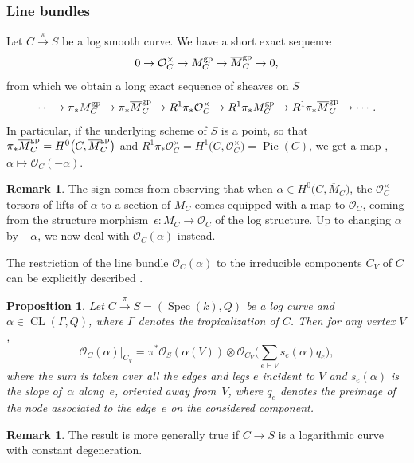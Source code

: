 \documentclass[pdftex]{sigma}
\newcommand{\Pic}{\operatorname{Pic}}
\renewcommand{\O}{\mathcal{O}}
\numberwithin{equation}{section}
\newtheorem{prop}[theo]{Proposition}
\theoremstyle{definition}
\newtheorem{remarkk}[theo]{Remark}
\begin{document}
\subsubsection{Line bundles}
Let $C\xrightarrow{\pi} S$ be a log smooth curve. We have a short exact sequence
\begin{equation}\label{eq:logseq}
0\to\mathcal O_C^{\times}\to M_C^{\rm gp}\to\overline{M}_C^{\rm gp}\to 0,\end{equation}
from which we obtain a long exact sequence of sheaves on $S$
\begin{align*}
 \cdots\to \pi_*M_C^{\rm gp}\to\pi_*\overline{M}_C^{\rm gp}\to
 R^1\pi_*\mathcal O_C^{\times}\to
 R^1\pi_*M_C^{\rm gp}\to R^1\pi_*\overline{M}_C^{\rm gp}\to\cdots.
\end{align*}
In particular, if the underlying scheme of $S$ is a point, so that $\pi_*\overline{M}^{\rm gp}_C=H^0\bigl(C,\overline{M}^{\rm gp}_C\bigr)$ and $R^1\pi_*\O_C^\times=H^1\bigl(C,\O_C^\times\bigr)=\Pic(C)$, we get a map
\smash{$
 H^0\bigl(C,\overline{M}_C^{\rm gp}\bigr)\to \Pic^0(C)$}, $
 \alpha \mapsto\mathcal O_C(-\alpha)$.

\begin{remarkk}
 The sign comes from observing that when $\alpha\in H^0\bigl(C,\overline{M}_C\bigr)$, the $\mathcal O_C^{\times}$-torsors of lifts of $\alpha$ to a section of $M_C$ comes equipped with a map to $\mathcal O_C$, coming from the structure morphism~${\epsilon \colon M_C\to\mathcal O_C}$ of the log structure. Up to changing $\alpha$ by $-\alpha$, we now deal with $\O_C(\alpha)$ instead.
\end{remarkk}

The restriction of the line bundle $\mathcal O_C(\alpha)$ to the irreducible components $C_V$ of $C$ can be explicitly described \cite[Proposition~3.3.3]{marcuswiselog}.
\begin{prop}
 Let $C\xrightarrow{\pi} S=(\operatorname{Spec}(k),Q)$ be a log curve and $\alpha\in\operatorname{CL}(\Gamma, Q)$, where $\Gamma$ denotes the tropicalization of $C$. Then for any vertex $V$,
 \[\mathcal O_C(\alpha)\rvert_{C_V}=\pi^*\mathcal O_S(\alpha(V))\otimes\mathcal O_{C_V}\biggl(\sum_{e\vdash V} s_e(\alpha) q_e\biggr),
 \]
where the sum is taken over all the edges and legs $e$ incident to $V$ and $s_e(\alpha)$ is the slope of~$\alpha$ along~$e$, oriented away from~$V$, where $q_e$ denotes the preimage of the node associated to the edge~$e$ on the considered component.
\end{prop}
\begin{remarkk}
 The result is more generally true if $C\to S$ is a logarithmic curve with constant degeneration.
\end{remarkk}
\end{document}
